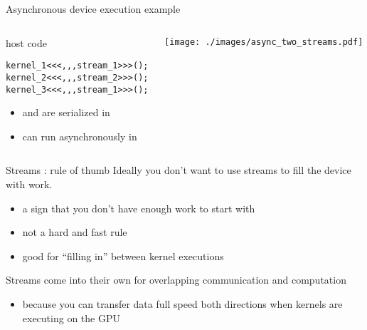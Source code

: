 \begin{frame}[fragile]{Asynchronous device execution example}
    \begin{columns}[T]
        \begin{column}{0.4\textwidth}
            \begin{codecolumn}{host code}
                \begin{lstlisting}[style=boxcudatiny]
kernel_1<<<,,,stream_1>>>();
kernel_2<<<,,,stream_2>>>();
kernel_3<<<,,,stream_1>>>();
                \end{lstlisting}
            \end{codecolumn}
            \begin{itemize}
                \item {} and  are serialized in 
                \item {} can run asynchronously in 
            \end{itemize}
        \end{column}
        \begin{column}{0.6\textwidth}
                \texttt{[image: ./images/async\_two\_streams.pdf]}
        \end{column}
    \end{columns}
\end{frame}

\begin{frame}[fragile]{Streams : rule of thumb}
    Ideally you don't want to use streams to fill the device with work.
    \begin{itemize}
        \item a sign that you don't have enough work to start with
        \item not a hard and fast rule
        \item good for ``filling in'' between kernel executions
    \end{itemize}

    Streams come into their own for overlapping communication and computation
    \begin{itemize}
        \item because you can transfer data full speed both directions when kernels are executing on the GPU
    \end{itemize}
\end{frame}

